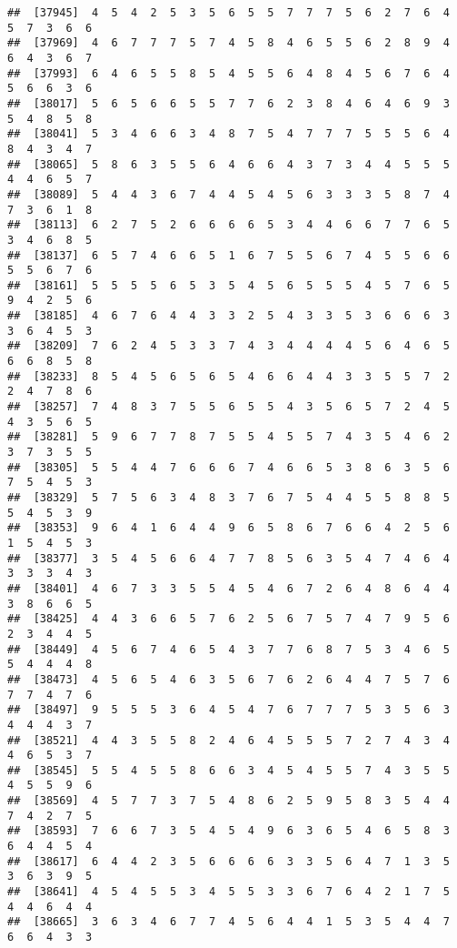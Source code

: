 \documentclass[
]{book}
\begin{document}
\begin{verbatim}
##  [37945]  4  5  4  2  5  3  5  6  5  5  7  7  7  5  6  2  7  6  4  5  7  3  6  6
##  [37969]  4  6  7  7  7  5  7  4  5  8  4  6  5  5  6  2  8  9  4  6  4  3  6  7
##  [37993]  6  4  6  5  5  8  5  4  5  5  6  4  8  4  5  6  7  6  4  5  6  6  3  6
##  [38017]  5  6  5  6  6  5  5  7  7  6  2  3  8  4  6  4  6  9  3  5  4  8  5  8
##  [38041]  5  3  4  6  6  3  4  8  7  5  4  7  7  7  5  5  5  6  4  8  4  3  4  7
##  [38065]  5  8  6  3  5  5  6  4  6  6  4  3  7  3  4  4  5  5  5  4  4  6  5  7
##  [38089]  5  4  4  3  6  7  4  4  5  4  5  6  3  3  3  5  8  7  4  7  3  6  1  8
##  [38113]  6  2  7  5  2  6  6  6  6  5  3  4  4  6  6  7  7  6  5  3  4  6  8  5
##  [38137]  6  5  7  4  6  6  5  1  6  7  5  5  6  7  4  5  5  6  6  5  5  6  7  6
##  [38161]  5  5  5  5  6  5  3  5  4  5  6  5  5  5  4  5  7  6  5  9  4  2  5  6
##  [38185]  4  6  7  6  4  4  3  3  2  5  4  3  3  5  3  6  6  6  3  3  6  4  5  3
##  [38209]  7  6  2  4  5  3  3  7  4  3  4  4  4  4  5  6  4  6  5  6  6  8  5  8
##  [38233]  8  5  4  5  6  5  6  5  4  6  6  4  4  3  3  5  5  7  2  2  4  7  8  6
##  [38257]  7  4  8  3  7  5  5  6  5  5  4  3  5  6  5  7  2  4  5  4  3  5  6  5
##  [38281]  5  9  6  7  7  8  7  5  5  4  5  5  7  4  3  5  4  6  2  3  7  3  5  5
##  [38305]  5  5  4  4  7  6  6  6  7  4  6  6  5  3  8  6  3  5  6  7  5  4  5  3
##  [38329]  5  7  5  6  3  4  8  3  7  6  7  5  4  4  5  5  8  8  5  5  4  5  3  9
##  [38353]  9  6  4  1  6  4  4  9  6  5  8  6  7  6  6  4  2  5  6  1  5  4  5  3
##  [38377]  3  5  4  5  6  6  4  7  7  8  5  6  3  5  4  7  4  6  4  3  3  3  4  3
##  [38401]  4  6  7  3  3  5  5  4  5  4  6  7  2  6  4  8  6  4  4  3  8  6  6  5
##  [38425]  4  4  3  6  6  5  7  6  2  5  6  7  5  7  4  7  9  5  6  2  3  4  4  5
##  [38449]  4  5  6  7  4  6  5  4  3  7  7  6  8  7  5  3  4  6  5  5  4  4  4  8
##  [38473]  4  5  6  5  4  6  3  5  6  7  6  2  6  4  4  7  5  7  6  7  7  4  7  6
##  [38497]  9  5  5  5  3  6  4  5  4  7  6  7  7  7  5  3  5  6  3  4  4  4  3  7
##  [38521]  4  4  3  5  5  8  2  4  6  4  5  5  5  7  2  7  4  3  4  4  6  5  3  7
##  [38545]  5  5  4  5  5  8  6  6  3  4  5  4  5  5  7  4  3  5  5  4  5  5  9  6
##  [38569]  4  5  7  7  3  7  5  4  8  6  2  5  9  5  8  3  5  4  4  7  4  2  7  5
##  [38593]  7  6  6  7  3  5  4  5  4  9  6  3  6  5  4  6  5  8  3  6  4  4  5  4
##  [38617]  6  4  4  2  3  5  6  6  6  6  3  3  5  6  4  7  1  3  5  3  6  3  9  5
##  [38641]  4  5  4  5  5  3  4  5  5  3  3  6  7  6  4  2  1  7  5  4  4  6  4  4
##  [38665]  3  6  3  4  6  7  7  4  5  6  4  4  1  5  3  5  4  4  7  6  6  4  3  3

\end{verbatim}
\end{document}
